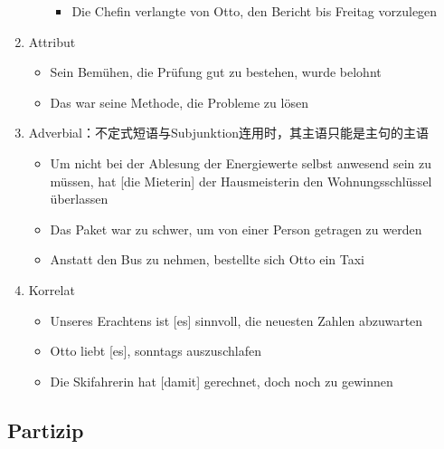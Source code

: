 \documentclass[UTF8]{report}
\begin{document}
\begin{enumerate}
\begin{enumerate}
\begin{itemize}
            \item Die Chefin verlangte von Otto, den Bericht bis Freitag vorzulegen
        \end{itemize}
    \end{enumerate}
    \item Attribut
    \begin{itemize}
        \item Sein Bemühen, die Prüfung gut zu bestehen, wurde belohnt
        \item Das war seine Methode, die Probleme zu lösen
    \end{itemize}
    \item Adverbial：不定式短语与Subjunktion连用时，其主语只能是主句的主语
    \begin{itemize}
        \item Um nicht bei der Ablesung der Energiewerte selbst anwesend sein zu müssen, hat [die Mieterin] der Hausmeisterin den Wohnungsschlüssel überlassen
        \item Das Paket war zu schwer, um von einer Person getragen zu werden
        \item Anstatt den Bus zu nehmen, bestellte sich Otto ein Taxi
    \end{itemize}
    \item Korrelat
    \begin{itemize}
        \item Unseres Erachtens ist [es] sinnvoll, die neuesten Zahlen abzuwarten
        \item Otto liebt [es], sonntags auszuschlafen
        \item Die Skifahrerin hat [damit] gerechnet, doch noch zu gewinnen
    \end{itemize}
\end{enumerate}

\subsection{Partizip}
\end{document}

